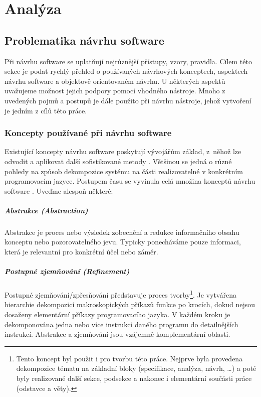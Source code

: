 \chapter{Analýza}

\section{Problematika návrhu software}
Při návrhu software se uplatňují nejrůznější přístupy, vzory, pravidla. Cílem této sekce je podat rychlý přehled o používaných návrhových konceptech, aspektech návrhu software a objektově orientovaném návrhu. U některých aspektů uvažujeme možnost jejich podpory pomocí vhodného nástroje. Mnoho z uvedených pojmů a postupů je dále použito při návrhu nástroje, jehož vytvoření je jedním z cílů této práce.

\subsection{Koncepty používané při návrhu software}
Existující koncepty návrhu software poskytují vývojářům základ, z~něhož lze odvodit a aplikovat další sofistikované metody \cite{wiki:software_design}. Většinou se jedná o různé pohledy na způsob dekompozice systému na části realizovatelné v konkrétním programovacím jazyce. Postupem času se vyvinula celá množina konceptů návrhu software \cite{swengineeringconcepts}. Uveďme alespoň některé:

\paragraph{Abstrakce (Abstraction)} Abstrakce je proces nebo výsledek zobecnění a redukce informačního obsahu konceptu nebo pozorovatelného jevu. Typicky ponecháváme pouze informaci, která je relevantní pro konkrétní účel nebo záměr.

\paragraph{Postupné zjemňování (Refinement)} Postupné zjemňování/zpřesňování představuje proces tvorby\footnote{Tento koncept byl použit i pro tvorbu této práce. Nejprve byla provedena dekompozice tématu na základní bloky (specifikace, analýza, návrh, \ldots) a poté byly  realizované další sekce, podsekce a nakonec i elementární součásti práce (odstavce a věty).}. Je vytvářena hierarchie dekompozicí makroskopických příkazů funkce po krocích, dokud nejsou dosaženy elementární příkazy programovacího jazyka. V každém kroku je dekomponována jedna nebo více instrukcí daného programu do detailnějších instrukcí. Abstrakce a zjemňování jsou vzájemně komplementární oblasti.

